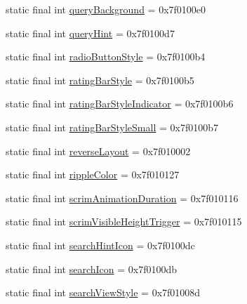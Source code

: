 \begin{CompactItemize}
static final int \hyperlink{classandroid_1_1support_1_1graphics_1_1drawable_1_1animated_1_1_r_1_1attr_750d5752f98c5b32167100acfa9834de}{queryBackground} = 0x7f0100e0
\item 
static final int \hyperlink{classandroid_1_1support_1_1graphics_1_1drawable_1_1animated_1_1_r_1_1attr_0a35262d4e88fea4a4565330e8da18ed}{queryHint} = 0x7f0100d7
\item 
static final int \hyperlink{classandroid_1_1support_1_1graphics_1_1drawable_1_1animated_1_1_r_1_1attr_4f45ce334d60d9839012d2d4f599bd17}{radioButtonStyle} = 0x7f0100b4
\item 
static final int \hyperlink{classandroid_1_1support_1_1graphics_1_1drawable_1_1animated_1_1_r_1_1attr_a4ec69890716dd71ed80d775161e9faa}{ratingBarStyle} = 0x7f0100b5
\item 
static final int \hyperlink{classandroid_1_1support_1_1graphics_1_1drawable_1_1animated_1_1_r_1_1attr_9be200b14a1da57db4b762d5dcb7c21e}{ratingBarStyleIndicator} = 0x7f0100b6
\item 
static final int \hyperlink{classandroid_1_1support_1_1graphics_1_1drawable_1_1animated_1_1_r_1_1attr_fc8db74f0ba732e0d108a22503ddf0f0}{ratingBarStyleSmall} = 0x7f0100b7
\item 
static final int \hyperlink{classandroid_1_1support_1_1graphics_1_1drawable_1_1animated_1_1_r_1_1attr_a36824a6b6352b37f1314f49929bd44b}{reverseLayout} = 0x7f010002
\item 
static final int \hyperlink{classandroid_1_1support_1_1graphics_1_1drawable_1_1animated_1_1_r_1_1attr_6b03469d7fa93759fe7a3778e2e40753}{rippleColor} = 0x7f010127
\item 
static final int \hyperlink{classandroid_1_1support_1_1graphics_1_1drawable_1_1animated_1_1_r_1_1attr_e53719b638f5b8a2c921dbcddf09d93f}{scrimAnimationDuration} = 0x7f010116
\item 
static final int \hyperlink{classandroid_1_1support_1_1graphics_1_1drawable_1_1animated_1_1_r_1_1attr_3e40f6603d8e364d05d3f1309c51b575}{scrimVisibleHeightTrigger} = 0x7f010115
\item 
static final int \hyperlink{classandroid_1_1support_1_1graphics_1_1drawable_1_1animated_1_1_r_1_1attr_852ff33255c7aeb11e9506fcde417807}{searchHintIcon} = 0x7f0100dc
\item 
static final int \hyperlink{classandroid_1_1support_1_1graphics_1_1drawable_1_1animated_1_1_r_1_1attr_413d0265e27e07306b050b685ca885bf}{searchIcon} = 0x7f0100db
\item 
static final int \hyperlink{classandroid_1_1support_1_1graphics_1_1drawable_1_1animated_1_1_r_1_1attr_215867edcc6899c81b7070d8129cf5d9}{searchViewStyle} = 0x7f01008d

\end{CompactItemize}
